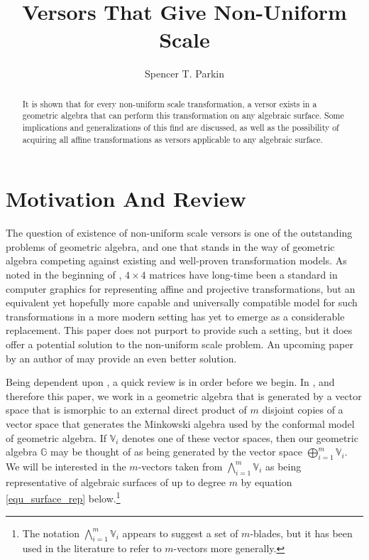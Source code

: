 \documentclass{birkjour}
\theoremstyle{definition}
\theoremstyle{remark}
\numberwithin{equation}{section}
\newcommand{\G}{\mathbb{G}}
\newcommand{\V}{\mathbb{V}}
\begin{document}
\title{Versors That Give Non-Uniform Scale}

\author{Spencer T. Parkin}
\address{102 W. 500 S., \\
Salt Lake City, UT  84101} 



\begin{abstract}
It is shown that for every non-uniform scale transformation, a versor
exists in a geometric algebra that can perform this transformation
on any algebraic surface.  Some implications and generalizations of this find are discussed,
as well as the possibility of acquiring all affine transformations as versors applicable
to any algebraic surface.
\end{abstract}


\maketitle

\section{Motivation And Review}

The question of existence of non-uniform scale versors is one of the outstanding problems of geometric algebra,
and one that stands in the way of geometric algebra competing against existing and well-proven transformation models.
As noted in the beginning of \cite{Goldman12}, $4\times 4$ matrices have long-time been a standard
in computer graphics for representing affine and projective transformations, but an
equivalent yet hopefully more capable and universally compatible model for such transformations in a more modern setting has yet to emerge
as a considerable replacement.  This paper does not purport to provide such a setting,
but it does offer a potential solution to the non-uniform scale problem.
An upcoming paper by an author of \cite{Dorst07} may provide an even better solution.

Being dependent upon \cite{Parkin13}, a quick review is in order before we begin.
In \cite{Parkin13}, and therefore this paper, we work in a geometric algebra that is generated
by a vector space that is ismorphic to an external direct product of $m$ disjoint copies of a vector space
that generates the Minkowski algebra used by the conformal model of geometric algebra.  If $\V_i$ denotes one of these vector spaces,
then our geometric algebra $\G$ may be thought of as being generated by the vector space $\bigoplus_{i=1}^m\V_i$.
We will be interested in the $m$-vectors
taken from $\bigwedge_{i=1}^m \V_i$ as being representative of algebraic surfaces
of up to degree $m$ by equation \eqref{equ_surface_rep} below.\footnote{The notation $\bigwedge_{i=1}^m\V_i$
appears to suggest a set of $m$-blades, but it has been used in the literature to refer to $m$-vectors more generally.}
\end{document}

